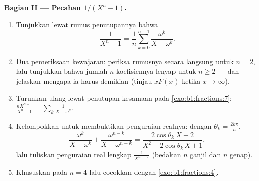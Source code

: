 \begin{problem}
\medskip
\noindent\textbf{Bagian II --- Pecahan $1/(X^n - 1)$.}
\begin{enumerate}[resume]
  \item Tunjukkan lewat rumus penutupannya bahwa
        \[
        \frac{1}{X^n - 1}
        = \frac1n\sum_{k=0}^{n-1}\frac{\omega^k}{X - \omega^k} .
        \]
  \item Dua pemeriksaan kewajaran: periksa rumusnya secara langsung untuk $n =
        2$, lalu tunjukkan bahwa jumlah $n$ koefisiennya
        lenyap untuk $n \geq 2$ --- dan jelaskan mengapa ia harus demikian (tinjau
        $xF(x)$ ketika $x \to \infty$).
  \item Turunkan ulang lewat penutupan kesamaan pada
        \cref{exo:b1:fractions:7}:
        $\frac{nX^{n-1}}{X^n-1} = \sum_k \frac1{X - \omega^k}$.
  \item Kelompokkan   untuk membuktikan penguraian realnya:
        dengan $\theta_k = \frac{2k\pi}n$,
        \[
        \frac{\omega^k}{X - \omega^k} +
        \frac{\omega^{n-k}}{X - \omega^{n-k}}
        = \frac{2\cos\theta_k\,X - 2}
        {X^2 - 2\cos\theta_k\,X + 1} ,
        \]
        lalu tuliskan penguraian real lengkap
        $\frac1{X^n-1}$ (bedakan $n$ ganjil dan $n$ genap).
  \item Khususkan pada $n = 4$ lalu cocokkan dengan
        \cref{exo:b1:fractions:4}.
\end{enumerate}


\end{problem}
